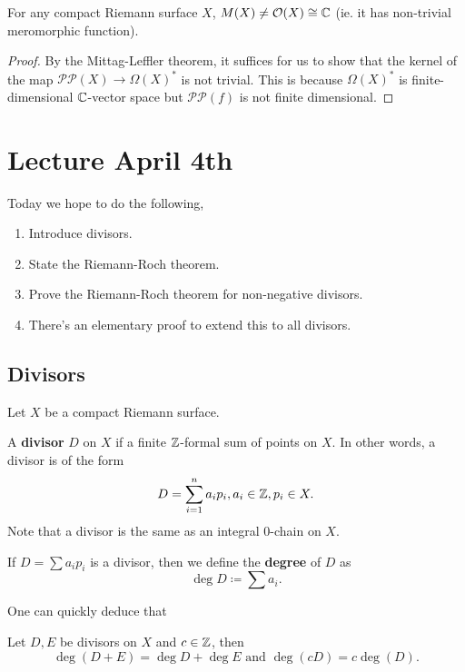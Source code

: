 \documentclass{article}
\begin{document}
{\begin{theorem}
    For any compact Riemann surface $X$, $M(X) \neq \mathcal{O}(X) \cong \mathbb{C}$ (ie. it has non-trivial meromorphic function).
\end{theorem}

\begin{proof}
    By the Mittag-Leffler theorem, it suffices for us to show that the kernel of the map $\mathcal{P} \mathcal{P}(X) \to \Omega(X)^*$ is not trivial. This is because $\Omega(X)^*$ is finite-dimensional $\mathbb{C}$-vector space but $\mathcal{P} \mathcal{P}(f)$ is not finite dimensional.
\end{proof}

\newpage
\section{Lecture April 4th}

Today we hope to do the following,
\begin{enumerate}
    \item Introduce divisors.
    \item State the Riemann-Roch theorem.
    \item Prove the Riemann-Roch theorem for non-negative divisors.
    \item There's an elementary proof to extend this to all divisors.
\end{enumerate}

\subsection{Divisors}

Let $X$ be a compact Riemann surface.
\begin{definition}
    A \textbf{divisor} $D$ on $X$ if a finite $\mathbb{Z}$-formal sum of points on $X$. In other words, a divisor is of the form
    \[D = \sum_{i = 1}^n a_i p_i, a_i \in \mathbb{Z}, p_i \in X.\]
    Note that a divisor is the same as an integral $0$-chain on $X$.
\end{definition}

\begin{definition}
    If $D = \sum a_i p_i$ is a divisor, then we define the \textbf{degree} of $D$ as
    \[\operatorname{deg} D \coloneqq \sum a_i.\]
\end{definition}

One can quickly deduce that
\begin{lemma}
    Let $D, E$ be divisors on $X$ and $c \in \mathbb{Z}$, then
    \[\deg(D+E) = \deg D + \deg E \text{ and } \deg(cD) = c \deg(D).\]
\end{lemma}

}
\end{document}
